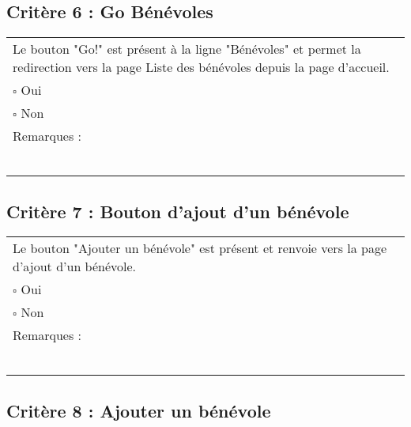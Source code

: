   		
  	\subsection*{Critère 6 : Go Bénévoles}
	
	\begin{center}
    	 		\begin{tabular}[h]{|p{}|}
			\hline
				Le bouton "Go!" est présent à la ligne "Bénévoles" et permet la redirection vers la page Liste des bénévoles depuis la page d'accueil. \\
				$\square$ Oui  \\ $\square$ Non \\\hline Remarques : \\ ~\\
			 \\\hline
     		\end{tabular}
  		\end{center}	
  		
  		
  	\subsection*{Critère 7 : Bouton d'ajout d'un bénévole}
	
	\begin{center}
    	 		\begin{tabular}[h]{|p{}|}
			\hline
				Le bouton "Ajouter un bénévole" est présent et renvoie vers la page d'ajout d'un bénévole. \\
				$\square$ Oui  \\ $\square$ Non \\\hline Remarques : \\ ~\\
			 \\\hline
     		\end{tabular}
  		\end{center}	
  		
  		
  	\subsection*{Critère 8 : Ajouter un bénévole}
	

